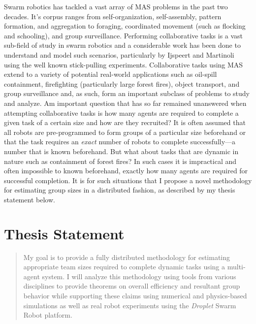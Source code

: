 \documentclass[11pt, onecolumn, compsoc, letterpaper]{article}
\begin{document}
Swarm robotics has tackled a vast array of MAS problems in the past two decades. It's corpus ranges from self-organization, self-assembly, pattern formation, and aggregation to foraging, coordinated movement (such as flocking and schooling), and group surveillance. Performing collaborative tasks is a vast sub-field of study in swarm robotics and a considerable work has been done to understand and model such scenarios, particularly by Ijspeert and Martinoli using the well known stick-pulling experiments. Collaborative tasks using MAS extend to a variety of potential real-world applications such as oil-spill containment, firefighting (particularly large forest fires), object transport, and group surveillance and, as such, form an important subclass of problems to study and analyze. Am important question that has so far remained unanswered when attempting collaborative tasks is how many agents are required to complete a given task of a certain size and how are they recruited? It is often assumed that all robots are pre-programmed to form groups of a particular size beforehand or that the task requires an \emph{exact} number of robots to complete successfully---a number that is known beforehand. But what about tasks that are dynamic in nature such as containment of forest fires? In  such cases it is impractical and often impossible to known beforehand, exactly how many agents are required for successful completion. It is for such situations that I propose a novel methodology for estimating group sizes in a distributed fashion, as described by my thesis statement below.

\section{Thesis Statement}
\begin{quote}
My goal is to provide a fully distributed methodology for estimating appropriate team sizes required to complete dynamic tasks using a multi-agent system. I will analyze this methodology using tools from various disciplines to provide theorems on overall efficiency and resultant group behavior while supporting these claims using numerical and physics-based simulations as well as real robot experiments using the \emph{Droplet} Swarm Robot platform.
\end{quote}
\end{document}

